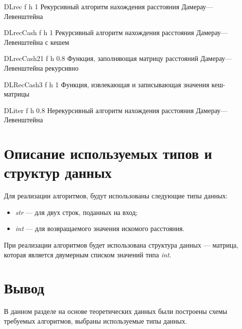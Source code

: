 {DLrec} %
{f} %
{h} %
{1\textwidth} %
{Рекурсивный алгоритм нахождения расстояния Дамерау---Левенштейна} %

{DLrecCash} %
{f} %
{h} %
{1\textwidth} %
{Рекурсивный алгоритм нахождения расстояния Дамерау---Левенштейна с кешем} %

{DLrecCash21} %
{f} %
{h} %
{0.8\textwidth} %
{Функция, заполняющая матрицу расстояний Дамерау---Левенштейна рекурсивно} %

{DLRecCash3} %
{f} %
{h} %
{1\textwidth} %
{Функция, извлекающая и записывающая значения кеш-матрицы} %


{DLiter} %
{f} %
{h} %
{0.8\textwidth} %
{Нерекурсивный алгоритм нахождения расстояния Дамерау---Левенштейна} %

\clearpage

\section{Описание используемых типов и структур данных}

Для реализации алгоритмов, будут использованы следующие типы данных:
\begin{itemize}
	\item \textit{str} --- для двух строк, поданных на вход;
	\item \textit{int} --- для возвращаемого значения искомого расстояния.
\end{itemize}

При реализации алгоритмов будет использована структура данных --- матрица, которая является двумерным списком значений типа \textit{int}.


\section*{Вывод}

В данном разделе на основе теоретических данных были построены схемы требуемых алгоритмов, выбраны используемые типы данных.
